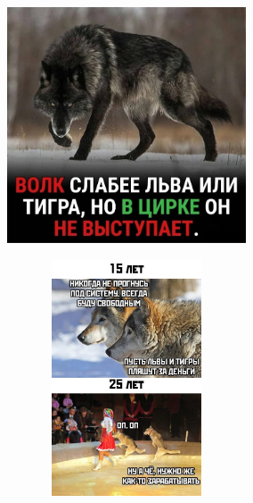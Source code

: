 \documentclass[aspectratio=169,notes]{beamer}
\begin{document}
\begin{frame}[t]{}
    \framesubtitle{}
    \begin{figure}[H]
        \begin{subfigure}{0.59\textwidth}
            \centering\includegraphics[height=7cm,width=1\textwidth,keepaspectratio]{wolf1.png}
            \label{fig:wolf1.png}
        \end{subfigure}
        \begin{subfigure}{0.39\textwidth}
            \centering\includegraphics[height=7cm,width=1\textwidth,keepaspectratio]{wolf2.png}
            \label{fig:wolf2.png}
        \end{subfigure}
    
    \end{figure}
\end{frame}
\end{document}

